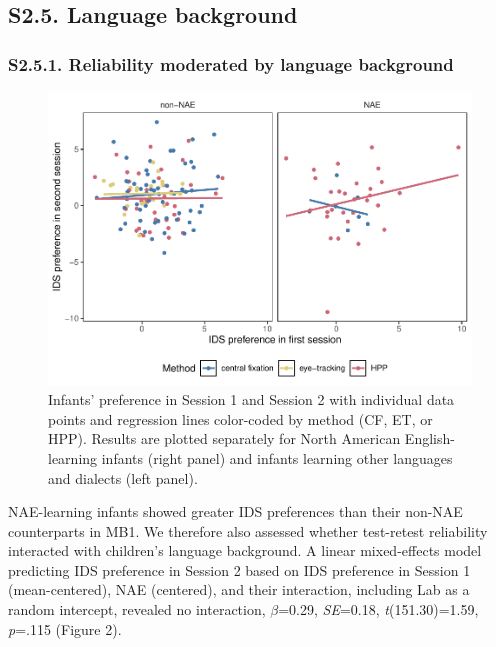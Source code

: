 \documentclass[
  english,
  man, donotrepeattitle,floatsintext]{apa6}
\begin{document}
\hypertarget{s2.5.-language-background}{%
\subsection{S2.5. Language background}\label{s2.5.-language-background}}

\hypertarget{s2.5.1.-reliability-moderated-by-language-background}{%
\subsubsection{S2.5.1. Reliability moderated by language background}\label{s2.5.1.-reliability-moderated-by-language-background}}

\begin{figure}
\centering
\includegraphics{MB1T_supplement_files/figure-latex/fig2-1.pdf}
\caption{\label{fig:fig2}Infants' preference in Session 1 and Session 2 with individual data points and regression lines color-coded by method (CF, ET, or HPP). Results are plotted separately for North American English-learning infants (right panel) and infants learning other languages and dialects (left panel).}
\end{figure}

NAE-learning infants showed greater IDS preferences than their non-NAE counterparts in MB1.
We therefore also assessed whether test-retest reliability interacted with children's language background.
A linear mixed-effects model predicting IDS preference in Session 2 based on IDS preference in Session 1 (mean-centered), NAE (centered), and their interaction, including Lab as a random intercept, revealed no interaction, \(\beta\)=0.29, \emph{SE}=0.18, \emph{t}(151.30)=1.59, \emph{p}=.115 (Figure 2).
\end{document}

